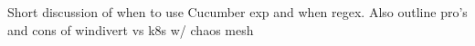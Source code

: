 Short discussion of when to use Cucumber exp and when regex. Also outline pro's and cons of windivert vs k8s w/ chaos mesh